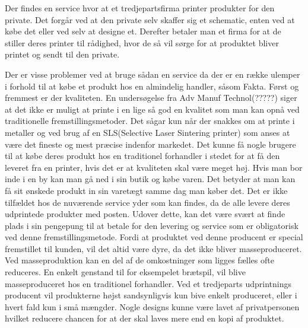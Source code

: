 Der findes en service hvor at et tredjepartsfirma printer produkter for den private. Det forgår ved at den private selv skaffer sig et schematic, enten ved at købe det eller ved selv at designe et. Derefter betaler man et firma for at de stiller deres printer til rådighed, hvor de så vil sørge for at produktet bliver printet og sendt til den private.

Der er visse problemer ved at bruge sådan en service da der er en række ulemper i forhold til at købe et produkt hos en almindelig handler, såsom Fakta. Først og fremmest er der kvaliteten. En undersøgelse fra Adv Manuf Technol(?????) siger at det ikke er muligt at printe i en lige så god en kvalitet som man kan opnå ved traditionelle fremstillingsmetoder. Det sågar kun når der snakkes om at printe i metaller og ved brug af en SLS(Selective Laser Sintering printer) som anses at være det fineste og mest præcise indenfor markedet. Det kunne få nogle brugere til at købe deres produkt hos en traditionel forhandler i stedet for at få den leveret fra en printer, hvis det er at kvaliteten skal være meget høj.
Hvis man bor inde i en by kan man gå ned i sin butik og købe varen. Det betyder at man kan få sit ønskede produkt in sin varetægt samme dag man køber det. Det er ikke tilfældet hos de nuværende service yder som kan findes, da de alle levere deres udprintede produkter med posten.
Udover dette, kan det være svært at finde plads i sin pengepung til at betale for den levering og service som er obligatorisk ved denne fremstillingsmetode. Fordi at produktet ved denne producent er special fremstillet til kunden, vil det altid være dyre, da det ikke bliver masseproduceret. Ved masseproduktion kan en del af de omkostninger som ligges fælles ofte reduceres. En enkelt genstand til for eksempelet brætspil, vil blive masseproduceret hos en traditionel forhandler. Ved et tredjeparts udprintnings producent vil produkterne højst sandsynligvis kun bive enkelt produceret, eller i hvert fald kun i små mængder. Nogle designs kunne være lavet af privatpersonen hvilket reducere chancen for at der skal laves mere end en kopi af produktet.
